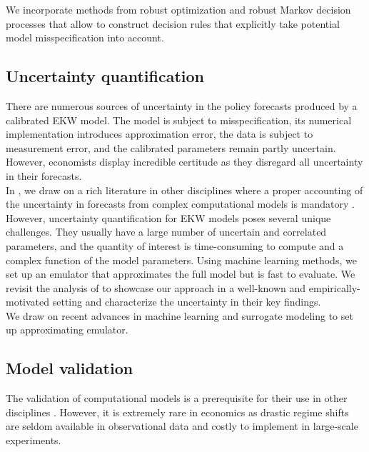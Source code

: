 \noindent We incorporate methods from robust optimization \citep{Ben-Tal.2009, Rahimian.2019, Wiesemann.2014} and robust Markov decision processes \citep{Iyengar.2005, Nilim.2005} that allow to construct decision rules that explicitly take potential model misspecification into account.
\subsection{Uncertainty quantification}
There are numerous sources of uncertainty in the policy forecasts produced by a calibrated EKW model. The model is subject to misspecification, its numerical implementation introduces approximation error, the data is subject to measurement error, and the calibrated parameters remain partly uncertain. However, economists display incredible certitude as they disregard all uncertainty \citep{Manski.2013} in their forecasts.\\

\noindent In \citet{Gabler.2020b}, we draw on a rich literature in other disciplines where a proper accounting of the uncertainty in forecasts from complex computational models is mandatory \citep{Saltelli.2004, Saltelli.2008, Smith.2014}. However, uncertainty quantification for EKW models poses several unique challenges. They usually have a large number of uncertain and correlated parameters, and the quantity of interest is time-consuming to compute and a complex function of the model parameters. Using machine learning methods, we set up an emulator that approximates the full model but is fast to evaluate. We revisit the analysis of \citep{Keane.1994, Keane.1997} to showcase our approach in a well-known and empirically-motivated setting and characterize the uncertainty in their key findings.\\

\noindent We draw on recent advances in machine learning \citep{Hastie.2008, Murphy.2012} and surrogate modeling \citep{Forrester.2008} to set up approximating emulator.
\subsection{Model validation}
The validation of computational models is a prerequisite for their use in other disciplines \citep{Adams.2012, Oberkampf.2010}. However, it is extremely rare in economics as drastic regime shifts are seldom available in observational data and costly to implement in large-scale experiments.\\

